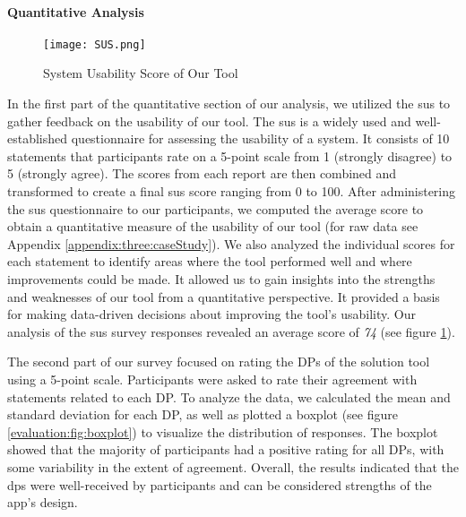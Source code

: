 \paragraph{Quantitative Analysis}
\begin{figure}[ht]
    \centering
    \texttt{[image: SUS.png]}
    \caption{System Usability Score of Our Tool}
    \label{evaluation:fig:sus}
\end{figure}
In the first part of the quantitative section of our analysis, we utilized the \ac{sus} to gather feedback on the usability of our tool. 
The \ac{sus} is a widely used and well-established questionnaire for assessing the usability of a system. 
It consists of 10 statements that participants rate on a 5-point scale from 1 (strongly disagree) to 5 (strongly agree). 
The scores from each report are then combined and transformed to create a final \ac{sus} score ranging from 0 to 100.
After administering the \ac{sus} questionnaire to our participants, we computed the average score to obtain a quantitative measure of the usability of our tool (for raw data see Appendix \ref{appendix:three:caseStudy}). 
We also analyzed the individual scores for each statement to identify areas where the tool performed well and where improvements could be made. 
It allowed us to gain insights into the strengths and weaknesses of our tool from a quantitative perspective. 
It provided a basis for making data-driven decisions about improving the tool's usability. 
Our analysis of the \ac{sus} survey responses revealed an average score of \textit{74} (see figure \ref{evaluation:fig:sus}).

The second part of our survey focused on rating the DPs of the solution tool using a 5-point scale. 
Participants were asked to rate their agreement with statements related to each DP. 
To analyze the data, we calculated the mean and standard deviation for each DP, as well as plotted a boxplot (see figure \ref{evaluation:fig:boxplot}) to visualize the distribution of responses. 
The boxplot showed that the majority of participants had a positive rating for all DPs, with some variability in the extent of agreement. 
Overall, the results indicated that the \ac{dp}s were well-received by participants and can be considered strengths of the app's design.


